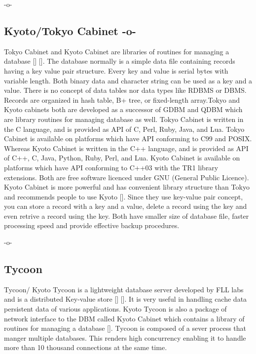      -o-

\subsection{Kyoto/Tokyo Cabinet -o-}

Tokyo Cabinet and Kyoto Cabinet are libraries of routines for managing
a database [\cite{www-tokyo-cabinet}] [\cite{www-kyoto-cabinet}].  The
database normally is a simple data file containing records having a
key value pair structure. Every key and value is serial bytes with
variable length. Both binary data and character string can be used as
a key and a value. There is no concept of data tables nor data types
like RDBMS or DBMS. Records are organized in hash table, B+ tree, or
fixed-length array.Tokyo and Kyoto cabinets both are developed as a
successor of GDBM and QDBM which are library routines for managing
database as well. Tokyo Cabinet is written in the C language, and is
provided as API of C, Perl, Ruby, Java, and Lua. Tokyo Cabinet is
available on platforms which have API conforming to C99 and
POSIX. Whereas Kyoto Cabinet is written in the C++ language, and is
provided as API of C++, C, Java, Python, Ruby, Perl, and Lua. Kyoto
Cabinet is available on platforms which have API conforming to C++03
with the TR1 library extensions. Both are free software licenced under
GNU (General Public Licence). Kyoto Cabinet is more powerful and has
convenient library structure than Tokyo and recommends people to use
Kyoto [\cite{www-tokyo-cabinet}]. Since they use key-value pair
concept, you can store a record with a key and a value, delete a
record using the key and even retrive a record using the key. Both
have smaller size of database file, faster processing speed and
provide effective backup procedures.

     -o-

     
\subsection{Tycoon}

Tycoon/ Kyoto Tycoon is a lightweight database server developed by FLL
labs and is a distributed Key-value
store [\cite{www-cloufare-tycoon}] [\cite{www-fallabs-tycoon}].  It is
very useful in handling cache data persistent data of various
applications. Kyoto Tycoon is also a package of network interface to
the DBM called Kyoto Cabinet which contains a library of routines for
managing a database [\cite{www-fallabs-kyoto}]. Tycoon is composed of a
sever process that manger multiple databases. This renders high
concurrency enabling it to handle more than 10 thousand connections at
the same time.

